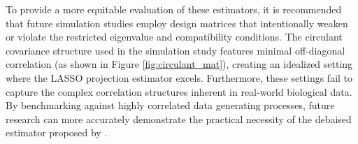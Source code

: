 \documentclass{article}
\begin{document}
To provide a more equitable evaluation of these estimators, it is recommended that future simulation studies employ design matrices that intentionally weaken or violate the restricted eigenvalue and compatibility conditions. The circulant covariance structure used in the simulation study features minimal off-diagonal correlation (as shown in Figure \ref{fig:circulant_mat}), creating an idealized setting where the LASSO projection estimator excels. Furthermore, these settings fail to capture the complex correlation structures inherent in real-world biological data. By benchmarking against highly correlated data generating processes, future research can more accurately demonstrate the practical necessity of the debaised estimator proposed by \citet{javanmard14a}.
\clearpage




\newpage


\label{supp:2} 
\end{document}
